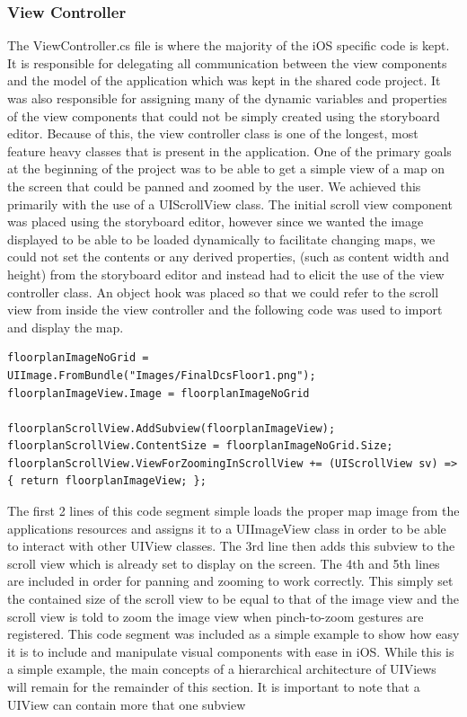 \documentclass[main.tex]{subfiles}
\begin{document}
\subsubsection{View Controller}
The ViewController.cs file is where the majority of the iOS specific code is kept. It is responsible for delegating all communication between the view components and the model of the application which was kept in the shared code project. It was also responsible for assigning many of the dynamic variables and properties of the view components that could not be simply created using the storyboard editor. Because of this, the view controller class is one of the longest, most feature heavy classes that is present in the application. One of the primary goals at the beginning of the project was to be able to get a simple view of a map on the screen that could be panned and zoomed by the user. We achieved this primarily with the use of a UIScrollView class. The initial scroll view component was placed using the storyboard editor, however since we wanted the image displayed to be able to be loaded dynamically to facilitate changing maps, we could not set the contents or any derived properties, (such as content width and height) from the storyboard editor and instead had to elicit the use of the view controller class. An object hook was placed so that we could refer to the scroll view from inside the view controller and the following code was used to import and display the map.
\begin{lstlisting}
floorplanImageNoGrid = UIImage.FromBundle("Images/FinalDcsFloor1.png");
floorplanImageView.Image = floorplanImageNoGrid

floorplanScrollView.AddSubview(floorplanImageView);
floorplanScrollView.ContentSize = floorplanImageNoGrid.Size;
floorplanScrollView.ViewForZoomingInScrollView += (UIScrollView sv) => { return floorplanImageView; };
\end{lstlisting}
The first 2 lines of this code segment simple loads the proper map image from the applications resources and assigns it to a UIImageView class in order to be able to interact with other UIView classes. The 3rd line then adds this subview to the scroll view which is already set to display on the screen. The 4th and 5th lines are included in order for panning and zooming to work correctly. This simply set the contained size of the scroll view to be equal to that of the image view and the scroll view is told to zoom the image view when pinch-to-zoom gestures are registered. This code segment was included as a simple example to show how easy it is to include and manipulate visual components with ease in iOS. While this is a simple example, the main concepts of a hierarchical architecture of UIViews will remain for the remainder of this section. It is important to note that a UIView can contain more that one subview
\end{document}
